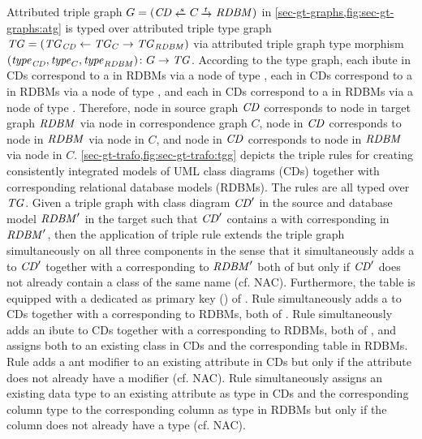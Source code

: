 \begin{example}
\label{ex:sec-tgg:tg}
Attributed triple graph $G=(\CD \transB{s} C \trans{t} \RDBM)$ in \cref{sec-gt-graphs,fig:sec-gt-graphs:atg} is typed over attributed triple type graph $\mathit{TG}=(\mathit{TG}_\mathit{CD} \gets \mathit{TG}_C \to \mathit{TG}_\mathit{RDBM})$ via attributed triple graph type morphism $(\mathit{type}_\mathit{CD},\mathit{type}_C,\mathit{type}_\mathit{RDBM})\colon G \to \mathit{TG}$.
According to the type graph, each ibute in CDs correspond to a  in RDBMs via a node of type , each  in CDs correspond to a  in RDBMs via a node of type , and each  in CDs correspond to a  in RDBMs via a node of type .
Therefore, node  in source graph $\mathit{CD}$ corresponds to node  in target graph $\mathit{RDBM}$ via node  in correspondence graph $C$, node  in $\mathit{CD}$ corresponds to node  in $\mathit{RDBM}$ via node  in $C$, and node  in $\mathit{CD}$ corresponds to node  in $\mathit{RDBM}$ via node  in $C$.
\cref{sec-gt-trafo,fig:sec-gt-trafo:tgg} depicts the triple rules for creating consistently integrated models of UML class diagrams (CDs) together with corresponding relational database models (RDBMs).
The rules are all typed over $\mathit{TG}$.
Given a triple graph with class diagram $\mathit{CD}'$ in the source and database model $\mathit{RDBM}'$ in the target such that $\mathit{CD}'$ contains a  with corresponding  in $\mathit{RDBM}'$, then the application of triple rule  extends the triple graph simultaneously on all three components in the sense that it simultaneously adds a  to $\mathit{CD}'$ together with a corresponding  to $\mathit{RDBM}'$ both of   but only if $\mathit{CD}'$ does not already contain a class of the same name (cf. NAC).
Furthermore, the table is equipped with a dedicated  as primary key () of  .
Rule  simultaneously adds a  to CDs together with a corresponding  to RDBMs, both of  .
Rule  simultaneously adds an ibute to CDs together with a corresponding  to RDBMs, both of  , and assigns both to an existing class in CDs and the corresponding table in RDBMs.
Rule  adds a ant modifier to an existing attribute in CDs but only if the attribute does not already have a modifier (cf. NAC).
Rule  simultaneously assigns an existing data type to an existing attribute as type in CDs and the corresponding column type to the corresponding column as type in RDBMs but only if the column does not already have a type (cf. NAC).

\end{example}
